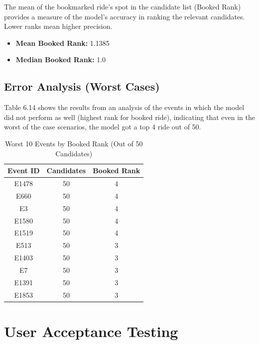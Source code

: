 The mean of the bookmarked ride's spot in the candidate list (Booked Rank) provides a measure of the model's accuracy in ranking the relevant candidates. Lower ranks mean higher precision.

\begin{itemize}
    \item \textbf{Mean Booked Rank:} 1.1385
    \item \textbf{Median Booked Rank:} 1.0
\end{itemize}

\subsection{Error Analysis (Worst Cases)}

Table 6.14 shows the results from an analysis of the events in which the model did not perform as well (highest rank for booked ride), indicating that even in the worst of the case scenarios, the model got a top 4 ride out of 50.

\begin{table}[H]
\centering
\caption{Worst 10 Events by Booked Rank (Out of 50 Candidates)}
\renewcommand{\arraystretch}{1.5}
\setlength{\tabcolsep}{20pt}
\begin{tabular}{|c|c|c|}
\hline
\rowcolor{gray!15} \textbf{Event ID} & \textbf{Candidates} & \textbf{Booked Rank} \\
\hline
E1478 & 50 & 4 \\
\hline
E660 & 50 & 4 \\
\hline
E3 & 50 & 4 \\
\hline
E1580 & 50 & 4 \\
\hline
E1519 & 50 & 4 \\
\hline
E513 & 50 & 3 \\
\hline
E1403 & 50 & 3 \\
\hline
E7 & 50 & 3 \\
\hline
E1391 & 50 & 3 \\
\hline
E1853 & 50 & 3 \\
\hline
\end{tabular}
\end{table}


\section{User Acceptance Testing}

